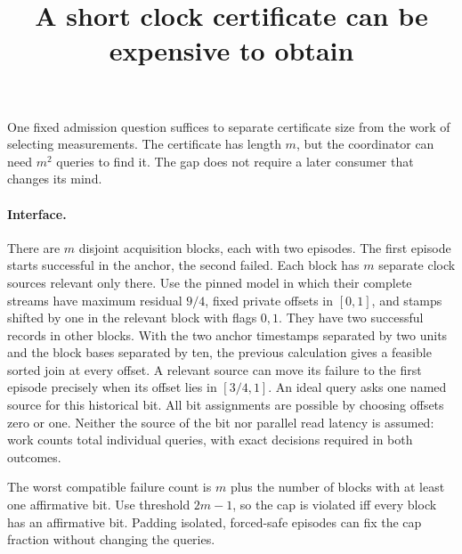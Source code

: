 \documentclass[11pt]{article}
\title{A short clock certificate can be expensive to obtain}
\begin{document}
\maketitle

One fixed admission question suffices to separate certificate size
from the work of selecting measurements. The certificate has length
\(m\), but the coordinator can need \(m^2\) queries to find it.
The gap does not require a later consumer that changes its mind.

\paragraph{Interface.}
There are \(m\) disjoint acquisition blocks, each with two episodes.
The first episode starts successful in the anchor, the second
failed. Each block has \(m\) separate clock sources relevant
only there. Use the pinned model in which their complete streams
have maximum residual \(9/4\), fixed private offsets in \([0,1]\),
and stamps shifted by one in the relevant block with flags
\(0,1\). They have two successful records in other blocks.
With the two anchor timestamps separated by two units and
the block bases separated by ten, the previous calculation
gives a feasible sorted join at every offset. A relevant
source can move its failure to the first episode precisely
when its offset lies in \([3/4,1]\).
An ideal query asks one named source for this historical bit.
All bit assignments are possible by choosing offsets zero
or one. Neither the source of the bit nor parallel read
latency is assumed: work counts total individual queries,
with exact decisions required in both outcomes.

The worst compatible failure count is \(m\) plus the number
of blocks with at least one affirmative bit. Use threshold
\(2m-1\), so the cap is violated iff every block has an
affirmative bit. Padding isolated, forced-safe episodes can
fix the cap fraction without changing the queries.
\end{document}
